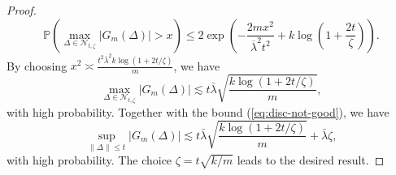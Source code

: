 \begin{proof}
\begin{equation}
\mathbb{P}\left(\max_{\Delta\in\mathcal{N}_{t,\zeta}}\left|G_m(\Delta)\right| > x\right) \leq 2\exp\left(-\frac{2mx^2}{\overline{\lambda}^2t^2}+k\log\left(1+\frac{2t}{\zeta}\right)\right).\label{eq:double-ub}
\end{equation}
By choosing $x^2\asymp \frac{t^2\bar{\lambda}^2k\log(1+2t/\zeta)}{m}$, we have
$$\max_{\Delta\in\mathcal{N}_{t,\zeta}}\left|G_m(\Delta)\right| \lesssim t\bar{\lambda}\sqrt{\frac{k\log(1+2t/\zeta)}{m}},$$
with high probability. Together with the bound (\ref{eq:disc-not-good}), we have
$$\sup_{\|\Delta\|\leq t}|G_m(\Delta)| \lesssim t\bar{\lambda}\sqrt{\frac{k\log(1+2t/\zeta)}{m}} + \bar{\lambda}\zeta,$$
with high probability.
The choice $\zeta=t\sqrt{k/m}$ leads to the desired result.
\end{proof}

